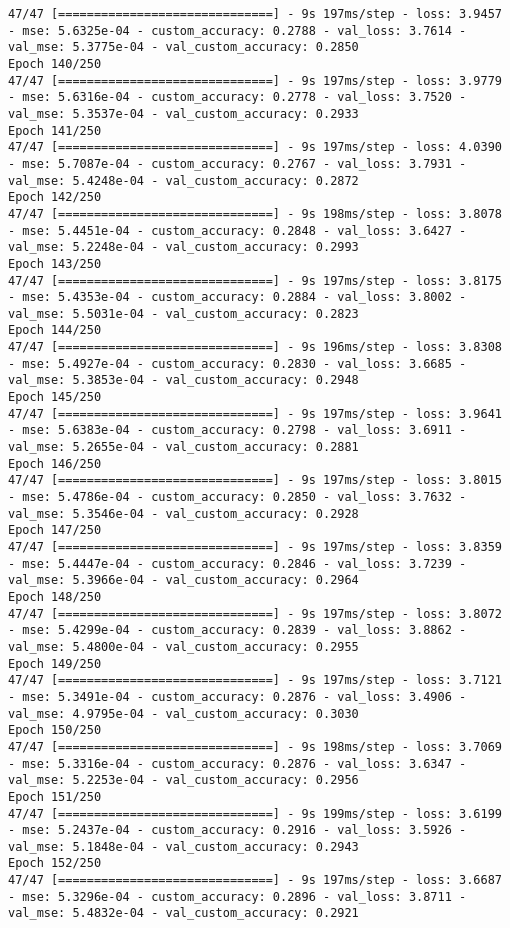 \begin{lstlisting}
47/47 [==============================] - 9s 197ms/step - loss: 3.9457 - mse: 5.6325e-04 - custom_accuracy: 0.2788 - val_loss: 3.7614 - val_mse: 5.3775e-04 - val_custom_accuracy: 0.2850
Epoch 140/250
47/47 [==============================] - 9s 197ms/step - loss: 3.9779 - mse: 5.6316e-04 - custom_accuracy: 0.2778 - val_loss: 3.7520 - val_mse: 5.3537e-04 - val_custom_accuracy: 0.2933
Epoch 141/250
47/47 [==============================] - 9s 197ms/step - loss: 4.0390 - mse: 5.7087e-04 - custom_accuracy: 0.2767 - val_loss: 3.7931 - val_mse: 5.4248e-04 - val_custom_accuracy: 0.2872
Epoch 142/250
47/47 [==============================] - 9s 198ms/step - loss: 3.8078 - mse: 5.4451e-04 - custom_accuracy: 0.2848 - val_loss: 3.6427 - val_mse: 5.2248e-04 - val_custom_accuracy: 0.2993
Epoch 143/250
47/47 [==============================] - 9s 197ms/step - loss: 3.8175 - mse: 5.4353e-04 - custom_accuracy: 0.2884 - val_loss: 3.8002 - val_mse: 5.5031e-04 - val_custom_accuracy: 0.2823
Epoch 144/250
47/47 [==============================] - 9s 196ms/step - loss: 3.8308 - mse: 5.4927e-04 - custom_accuracy: 0.2830 - val_loss: 3.6685 - val_mse: 5.3853e-04 - val_custom_accuracy: 0.2948
Epoch 145/250
47/47 [==============================] - 9s 197ms/step - loss: 3.9641 - mse: 5.6383e-04 - custom_accuracy: 0.2798 - val_loss: 3.6911 - val_mse: 5.2655e-04 - val_custom_accuracy: 0.2881
Epoch 146/250
47/47 [==============================] - 9s 197ms/step - loss: 3.8015 - mse: 5.4786e-04 - custom_accuracy: 0.2850 - val_loss: 3.7632 - val_mse: 5.3546e-04 - val_custom_accuracy: 0.2928
Epoch 147/250
47/47 [==============================] - 9s 197ms/step - loss: 3.8359 - mse: 5.4447e-04 - custom_accuracy: 0.2846 - val_loss: 3.7239 - val_mse: 5.3966e-04 - val_custom_accuracy: 0.2964
Epoch 148/250
47/47 [==============================] - 9s 197ms/step - loss: 3.8072 - mse: 5.4299e-04 - custom_accuracy: 0.2839 - val_loss: 3.8862 - val_mse: 5.4800e-04 - val_custom_accuracy: 0.2955
Epoch 149/250
47/47 [==============================] - 9s 197ms/step - loss: 3.7121 - mse: 5.3491e-04 - custom_accuracy: 0.2876 - val_loss: 3.4906 - val_mse: 4.9795e-04 - val_custom_accuracy: 0.3030
Epoch 150/250
47/47 [==============================] - 9s 198ms/step - loss: 3.7069 - mse: 5.3316e-04 - custom_accuracy: 0.2876 - val_loss: 3.6347 - val_mse: 5.2253e-04 - val_custom_accuracy: 0.2956
Epoch 151/250
47/47 [==============================] - 9s 199ms/step - loss: 3.6199 - mse: 5.2437e-04 - custom_accuracy: 0.2916 - val_loss: 3.5926 - val_mse: 5.1848e-04 - val_custom_accuracy: 0.2943
Epoch 152/250
47/47 [==============================] - 9s 197ms/step - loss: 3.6687 - mse: 5.3296e-04 - custom_accuracy: 0.2896 - val_loss: 3.8711 - val_mse: 5.4832e-04 - val_custom_accuracy: 0.2921

\end{lstlisting}
